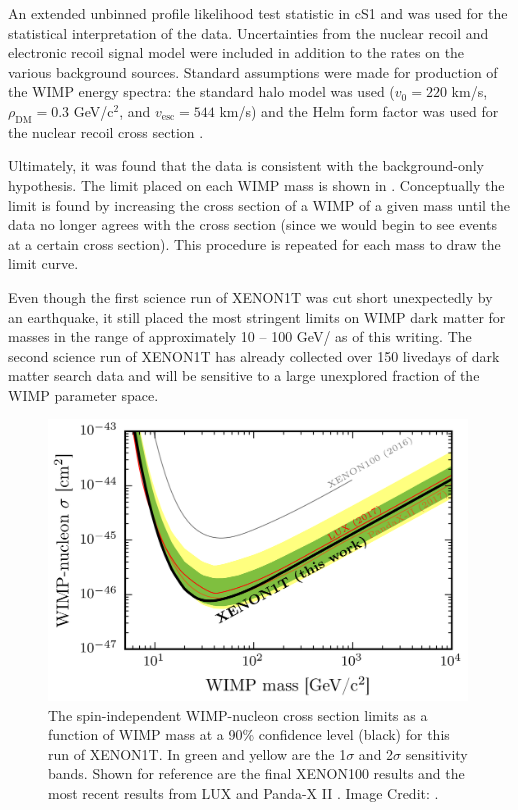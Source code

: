 An extended unbinned profile likelihood test statistic in cS1 and \csbottom{} was used for the statistical interpretation of the data.  Uncertainties from the nuclear recoil and electronic recoil signal model were included in addition to the rates on the various background sources.  Standard assumptions were made for production of the WIMP energy spectra: the standard halo model was used ($v_0 = 220$ km/s, $\rho_{\textrm{DM}} = 0.3$ GeV/$\textrm{c}^2$, and $v_{\textrm{esc}} = 544$ km/s) and the Helm form factor was used for the nuclear recoil cross section \cite{engel1991nuclear, lewin1996review}.

Ultimately, it was found that the data is consistent with the background-only hypothesis.  The limit placed on each WIMP mass is shown in .  Conceptually the limit is found by increasing the cross section of a WIMP of a given mass until the data no longer agrees with the cross section (since we would begin to see events at a certain cross section).  This procedure is repeated for each mass to draw the limit curve.  

Even though the first science run of XENON1T was cut short unexpectedly by an earthquake, it still placed the most stringent limits on WIMP dark matter for masses in the range of approximately 10 -- 100 GeV/\csquared{} as of this writing.  The second science run of XENON1T has already collected over 150 livedays of dark matter search data and will be sensitive to a large unexplored fraction of the WIMP parameter space.

\begin{figure}[p]
	\centering
	\includegraphics[width=0.99\textwidth]{xe1t_sr0_limit}
	\caption{ The spin-independent WIMP-nucleon cross section limits as a function of WIMP mass at a 90\% confidence level (black) for this run of XENON1T. In green and yellow are the 1$\sigma$ and 2$\sigma$ sensitivity bands.  Shown for reference are the final XENON100 results \cite{aprile2016xenon100} and the most recent results from LUX \cite{akerib2017results} and Panda-X II \cite{collaboration2017dark}.  Image Credit: .}
	\label{fig:xe1t_sr0_limit}
\end{figure}






